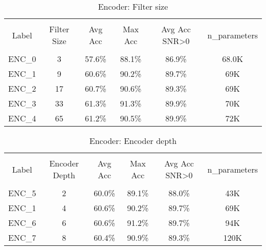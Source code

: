 \begin{table}[h!]
\centering
\begin{tabular}{| c  c  c  c  c  c |} 
 \hline \\[-1em]
 Label & Filter Size & Avg Acc & Max Acc & Avg Acc SNR>0 & n\_parameters \\ [1ex]  \\[-1em]
    ENC\_0 & 3 & 57.6\% & 88.1\% & 86.9\% & 68.0K \\ [1ex]
    ENC\_1 & 9 & 60.6\% & 90.2\% & 89.7\% & 69K \\ [1ex]
    ENC\_2 & 17 & 60.7\% & 90.6\% & 89.3\% & 69K \\ [1ex]
    ENC\_3 & 33 & 61.3\% & 91.3\% & 89.9\% & 70K \\ [1ex]
    ENC\_4 & 65 & 61.2\% & 90.5\% & 89.9\% & 72K \\ [1ex]
    
\hline
\end{tabular}
\caption{Encoder: Filter size}
\label{table:encoder_filter_size}
\end{table}

\begin{table}[h!]
\centering
\begin{tabular}{| c  c  c  c  c  c |} 
 \hline \\[-1em]
 Label & Encoder Depth & Avg Acc & Max Acc & Avg Acc SNR>0 & n\_parameters \\ [1ex]  \\[-1em]    
    ENC\_5 & 2 & 60.0\% & 89.1\% & 88.0\% & 43K \\ [1ex]
    ENC\_1 & 4 & 60.6\% & 90.2\% & 89.7\% & 69K \\ [1ex]
    ENC\_6 & 6 & 60.6\% & 91.2\% & 89.7\% & 94K \\ [1ex]
    ENC\_7 & 8 & 60.4\% & 90.9\% & 89.3\% & 120K \\ [1ex]
\hline
\end{tabular}
\caption{Encoder: Encoder depth}
\label{table:encoder_encoder_depth}
\end{table}

